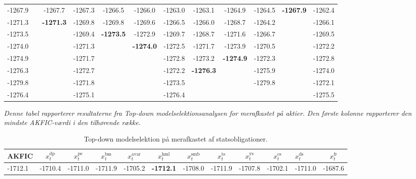 \documentclass[
  a4paper,
  oneside]{memoir}
\begin{document}
\begin{landscape}
\begin{table}[H]
\begin{threeparttable}
\begin{tabular}[t]{lccccccccclc}
-1267.9 &  & -1267.7 & -1267.3 & -1266.5 & -1266.0 & -1263.0 & -1263.1 & -1264.9 & -1264.5 & \textbf{-1267.9} & -1262.4\\
 
\rowcolor{gray!6}  -1271.3 &  & \textbf{-1271.3} & -1269.8 & -1269.8 & -1269.6 & -1266.5 & -1266.0 & -1268.7 & -1264.2 &  & -1266.1\\
 
-1273.5 &  &  & -1269.4 & \textbf{-1273.5} & -1272.9 & -1269.7 & -1268.7 & -1271.6 & -1266.7 &  & -1269.5\\
 
\rowcolor{gray!6}  -1274.0 &  &  & -1271.3 &  & \textbf{-1274.0} & -1272.5 & -1271.7 & -1273.9 & -1270.5 &  & -1272.2\\
 
-1274.9 &  &  & -1271.7 &  &  & -1272.8 & -1273.2 & \textbf{-1274.9} & -1272.3 &  & -1272.8\\
 
\rowcolor{gray!6}  -1276.3 &  &  & -1272.7 &  &  & -1272.2 & \textbf{-1276.3} &  & -1275.9 &  & -1274.0\\
 
-1279.8 &  &  & -1271.8 &  &  & -1273.5 &  &  & -1279.8 &  & -1272.1\\
 
\rowcolor{gray!6}  -1276.4 &  &  & -1275.1 &  &  & -1276.4 &  &  &  &  & -1275.5\\
\bottomrule
\end{tabular}
\begin{tablenotes}
\item \textit{Denne tabel rapporterer resultaterne fra \textit{Top-down} modelselektionsanalysen for merafkastet på aktier. Den første kolonne rapporterer den mindste AKFIC-værdi i den tilhørende række.}
\end{tablenotes}
\end{threeparttable}
\end{table}

\begin{table}[H]

\caption{\label{tab:STEP-S-TABLE}Top-down modelselektion på merafkastet af statsobligationer.}
\centering
\begin{threeparttable}
\begin{tabular}[t]{lccccccccclc}
\toprule
AKFIC & $x_t^{\text{dp}}$ & $x_t^{\text{pe}}$ & $x_t^{\text{bm}}$ & $x_t^{\text{avar}}$ & $x_t^{\text{hml}}$ & $x_t^{\text{smb}}$ & $x_t^{\text{ts}}$ & $x_t^{\text{ys}}$ & $x_t^{\text{cs}}$ & $x_t^{\text{ds}}$ & $x_t^{\text{fr}}$\\
\midrule
\rowcolor{gray!6}  -1712.1 & -1710.4 & -1711.0 & -1711.9 & -1705.2 & \textbf{-1712.1} & -1708.0 & -1711.9 & -1707.8 & -1702.1 & -1711.0 & -1687.6\\
 

\end{tabular}
\end{threeparttable}
\end{table}
\end{landscape}
\end{document}
